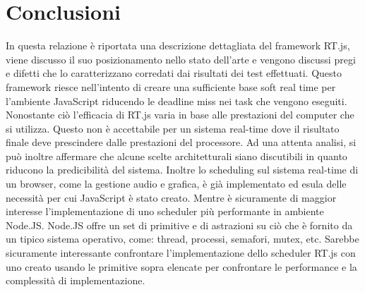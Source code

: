 \documentclass[conference]{IEEEtran}
\begin{document}
\section{Conclusioni}
In questa relazione è riportata una descrizione dettagliata del framework RT.js, viene discusso il suo posizionamento nello stato dell'arte e vengono discussi pregi e difetti che lo caratterizzano corredati dai risultati dei test effettuati.
\newline
Questo framework riesce nell'intento di creare una sufficiente base soft real time per l'ambiente JavaScript riducendo le deadline miss nei task che vengono eseguiti. Nonostante ciò l'efficacia di RT.js varia in base alle prestazioni del computer che si utilizza. Questo non è accettabile per un sistema real-time dove il risultato finale deve prescindere dalle prestazioni del processore. Ad una attenta analisi, si può inoltre affermare che alcune scelte architetturali siano discutibili in quanto riducono la predicibilità del sistema.
\newline
Inoltre lo scheduling sul sistema real-time di un browser, come la gestione audio e grafica, è già implementato ed esula delle necessità per cui JavaScript è stato creato. Mentre è sicuramente di maggior interesse l'implementazione di uno scheduler più performante in ambiente Node.JS. 
\newline
Node.JS offre un set di primitive e di astrazioni su ciò che è fornito da un tipico sistema operativo, come: thread, processi, semafori, mutex, etc. Sarebbe sicuramente interessante confrontare l'implementazione dello scheduler RT.js con uno creato usando le primitive sopra elencate per confrontare le performance e la complessità di implementazione.
\end{document}
